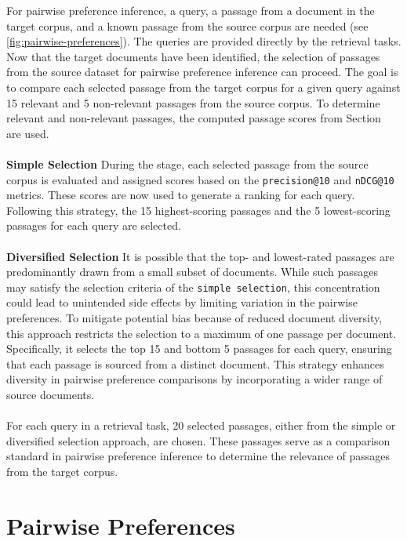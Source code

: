 For pairwise preference inference, a query, a passage from a document in the target corpus, and a known passage from the source corpus are needed (see \ref{fig:pairwise-preferences}). The queries are provided directly by the retrieval tasks. Now that the target documents have been identified, the selection of passages from the source dataset for pairwise preference inference can proceed. The goal is to compare each selected passage from the target corpus for a given query against 15 relevant and 5 non-relevant passages from the source corpus. To determine relevant and non-relevant passages, the computed passage scores from Section~ are used.
\\\\
\textbf{Simple Selection} During the  stage, each selected passage from the source corpus is evaluated and assigned scores based on the \texttt{precision@10} and \texttt{nDCG@10} metrics. These scores are now used to generate a ranking for each query. Following this strategy, the 15 highest-scoring passages and the 5 lowest-scoring passages for each query are selected.
\\\\
\textbf{Diversified Selection} It is possible that the top- and lowest-rated passages are predominantly drawn from a small subset of documents. While such passages may satisfy the selection criteria of the \texttt{simple selection}, this concentration could lead to unintended side effects by limiting variation in the pairwise preferences. To mitigate potential bias because of reduced document diversity, this approach restricts the selection to a maximum of one passage per document. Specifically, it selects the top 15 and bottom 5 passages for each query, ensuring that each passage is sourced from a distinct document. This strategy enhances diversity in pairwise preference comparisons by incorporating a wider range of source documents.
\\\\
For each query in a retrieval task, 20 selected passages, either from the simple or diversified selection approach, are chosen. These passages serve as a comparison standard in pairwise preference inference to determine the relevance of passages from the target corpus.


\pagebreak
\section{Pairwise Preferences}\label{pairwise-transfering-relevance-labels-across-datasets}

